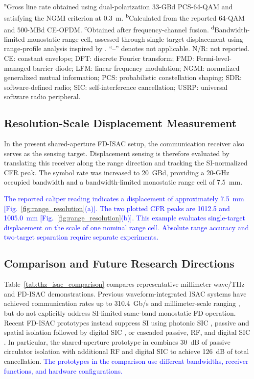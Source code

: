 \documentclass[10pt,journal]{IEEEtran}
\DeclareRobustCommand{\rev}[1]{\textcolor{blue}{#1}}
\begin{document}
\begin{table}[!t]
\vspace{1.5pt}
\parbox{\textwidth}{\scriptsize
\textsuperscript{a}Gross line rate obtained using
dual-polarization 33-GBd PCS-64-QAM and satisfying the NGMI
criterion at 0.3~m.
\textsuperscript{b}Calculated from the reported 64-QAM and
500-MBd CE-OFDM.
\textsuperscript{c}Obtained after frequency-channel fusion.
\textsuperscript{d}Bandwidth-limited monostatic range cell,
assessed through single-target displacement using range-profile
analysis inspired by \cite{lyu_multichannel_2024}.
``--'' denotes not applicable. N/R: not reported.
CE: constant envelope; DFT: discrete Fourier transform; FMD:
Fermi-level-managed barrier diode; LFM: linear frequency modulation;
NGMI: normalized generalized mutual information; PCS: probabilistic
constellation shaping; SDR: software-defined radio; SIC:
self-interference cancellation; USRP: universal software radio peripheral.
}
\end{table}

\subsection{Resolution-Scale Displacement Measurement}

In the present shared-aperture FD-ISAC setup, the communication
receiver also serves as the sensing target. Displacement sensing is
therefore evaluated by translating this receiver along the range
direction and tracking the SI-normalized CFR peak. The symbol rate
was increased to 20~GBd, providing a 20-GHz occupied bandwidth and
a bandwidth-limited monostatic range cell of 7.5~mm.

\rev{The reported caliper reading indicates a displacement of
approximately 7.5~mm [Fig.~\ref{fig:range_resolution}(a)]. The
two plotted CFR peaks are 1012.5 and 1005.0~mm
[Fig.~\ref{fig:range_resolution}(b)]. This example evaluates
single-target displacement on the scale of one nominal range
cell. Absolute range accuracy and two-target separation
require separate experiments.}

\subsection{Comparison and Future Research Directions}
\label{sec:discussion}

Table~\ref{tab:thz_isac_comparison} compares representative
millimeter-wave/THz and FD-ISAC demonstrations. Previous
waveform-integrated ISAC systems have achieved communication rates up
to 310.4~Gb/s and millimeter-scale ranging
\cite{lyu_multichannel_2024,shi_310_2026a}, but do not explicitly
address SI-limited same-band monostatic FD operation. Recent FD-ISAC
prototypes instead suppress SI using photonic SIC
\cite{yu_photonicsassisted_2024a}, passive and spatial isolation
followed by digital SIC \cite{duan_inband_2025}, or cascaded passive,
RF, and digital SIC \cite{du_fullduplex_2026}. In particular, the
shared-aperture prototype in \cite{du_fullduplex_2026} combines
30~dB of passive circulator isolation with additional RF and digital
SIC to achieve 126~dB of total cancellation. \rev{The prototypes in the comparison use different bandwidths,
receiver functions, and hardware configurations.}
\end{document}
